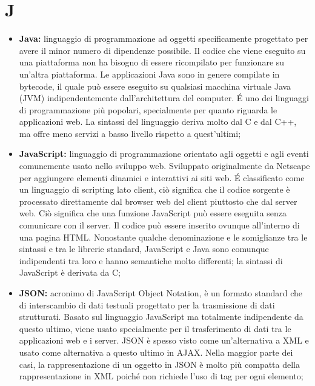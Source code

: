 \section*{J} %
\label{sec:j}
	\begin{itemize}
		\item \textbf{Java:} linguaggio di programmazione ad oggetti specificamente progettato per avere il minor numero di dipendenze possibile. Il codice che viene eseguito su una piattaforma non ha bisogno di essere ricompilato per funzionare su un'altra piattaforma. Le applicazioni Java sono in genere compilate in bytecode, il quale può essere eseguito su qualsiasi macchina virtuale Java (JVM) indipendentemente dall'architettura del computer. É uno dei linguaggi di programmazione più popolari, specialmente per quanto riguarda le applicazioni web. La sintassi del linguaggio deriva molto dal C e dal C++, ma offre meno servizi a basso livello rispetto a quest'ultimi;
		\item \textbf{JavaScript:} linguaggio di programmazione orientato agli oggetti e agli eventi comunemente usato nello sviluppo web. Sviluppato originalmente da Netscape per aggiungere elementi dinamici e interattivi ai siti web. É classificato come un linguaggio di scripting lato client, ciò significa che il codice sorgente è processato direttamente dal browser web del client piuttosto che dal server web. Ciò significa che una funzione JavaScript può essere eseguita senza comunicare con il server. Il codice può essere inserito ovunque all'interno di una pagina HTML. Nonostante qualche denominazione e le somiglianze tra le sintassi e tra le librerie standard, JavaScript e Java sono comunque indipendenti tra loro e hanno semantiche molto differenti; la sintassi di JavaScript è derivata da C;
		\item \textbf{JSON:} acronimo di JavaScript Object Notation, è un formato standard che di interscambio di dati testuali progettato per la trasmissione di dati strutturati. Basato sul linguaggio JavaScript ma totalmente indipendente da questo ultimo, viene usato specialmente per il trasferimento di dati tra le applicazioni web e i server. JSON è spesso visto come un'alternativa a XML e usato come alternativa a questo ultimo in AJAX. Nella maggior parte dei casi, la rappresentazione di un oggetto in JSON è molto più compatta della rappresentazione in XML poiché non richiede l'uso di tag per ogni elemento;
	\end{itemize}
\pagebreak
